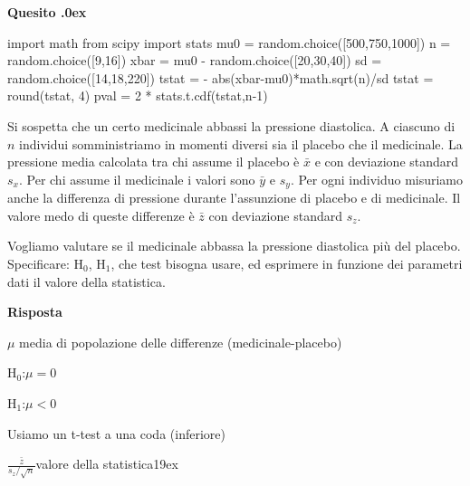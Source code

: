\documentclass[11pt,twoside,a4paper]{article}
\newcounter{quesito}
\newenvironment{question}{\bigskip\addtocounter{quesito}{1}\bigskip\bigskip\par\textbf{Quesito \thequesito.\kern0ex}}{\par\vspace{\parskip}}
\newenvironment{answer}{\par\textbf{Risposta\quad}}{\par\vspace{\parskip}}
\begin{document}
\begin{question}
\begin{pycode}
import math
from scipy import stats
mu0 = random.choice([500,750,1000])
n = random.choice([9,16])
xbar = mu0 - random.choice([20,30,40])
sd = random.choice([14,18,220])
tstat = - abs(xbar-mu0)*math.sqrt(n)/sd
tstat = round(tstat, 4)
pval = 2 * stats.t.cdf(tstat,n-1)
\end{pycode}
Si sospetta che un certo medicinale abbassi la pressione diastolica. A ciascuno di $n$ individui somministriamo in momenti diversi sia il placebo che il medicinale. La pressione media calcolata tra chi assume il placebo è $\bar x$ e con deviazione standard $s_x$. Per chi assume il medicinale i valori sono  $\bar y$ e $s_y$. Per ogni individuo misuriamo anche la differenza di pressione durante l'assunzione di placebo e di medicinale. Il valore medo di queste differenze è $\bar z$ con deviazione standard $s_z$.

Vogliamo valutare se il medicinale abbassa la pressione diastolica più del placebo. Specificare: H$_0$, H$_1$, che test bisogna usare, ed esprimere in funzione dei parametri dati il valore della statistica.

\begin{answer}

  $\mu$  media di popolazione delle differenze (medicinale-placebo)
  
  {\color{blue}H$_0$:\quad $\mu = 0$}
  
  {\color{blue}H$_1$:\quad $\mu<0$}
  
  {\color{blue}Usiamo un t-test a una coda (inferiore)}
  
  {\color{blue}$\displaystyle\frac{\bar{z}}{s_z/\sqrt{n}}$\hfill valore della statistica}\kern19ex

\end{answer}
\end{question}
\end{document}
